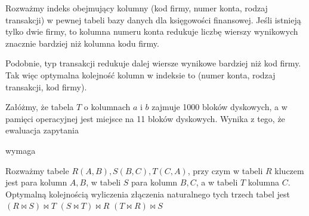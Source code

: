 \begin{example}
    Rozważmy indeks obejmujący kolumny (kod firmy, numer konta, rodzaj transakcji) w pewnej tabeli bazy danych dla księgowości finansowej. Jeśli istnieją tylko dwie firmy, to kolumna numeru konta redukuje liczbę wierszy wynikowych znacznie bardziej niż kolumna kodu firmy.

    Podobnie, typ transakcji redukuje dalej wiersze wynikowe bardziej niż kod firmy. Tak więc optymalna kolejność kolumn w indeksie to (numer konta, rodzaj transakcji, kod firmy).
\end{example}

\begin{problems}
    \prob Załóżmy, że tabela $T$ o kolumnach $a$ i $b$ zajmuje 1000 bloków dyskowych, a w pamięci operacyjnej jest miejsce na 11 bloków dyskowych. Wynika z tego, że ewaluacja zapytania
    \begin{center}
    \end{center}
    wymaga

    \prob Rozważmy tabele $R(A, B), S(B, C), T(C, A)$, przy czym w tabeli $R$ kluczem jest para kolumn $A, B$, w tabeli $S$ para kolumn $B, C$, a w tabeli $T$ kolumna $C$. Optymalną kolejnością wyliczenia złączenia naturalnego tych trzech tabel jest
    \answers
    {$(R \bowtie S) \bowtie T$}
    {$(S \bowtie T) \bowtie R$}
    {$(T \bowtie R) \bowtie S$}
\end{problems}

